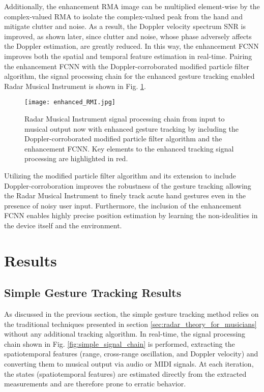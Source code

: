 \documentclass[10pt,journal,final]{IEEEtran}
\begin{document}
Additionally, the enhancement RMA image can be multiplied element-wise by the complex-valued RMA to isolate the complex-valued peak from the hand and mitigate clutter and noise. As a result, the Doppler velocity spectrum SNR is improved, as shown later, since clutter and noise, whose phase adversely affects the Doppler estimation, are greatly reduced. In this way, the enhancement FCNN improves both the spatial and temporal feature estimation in real-time. Pairing the enhancement FCNN with the Doppler-corroborated modified particle filter algorithm, the signal processing chain for the enhanced gesture tracking enabled Radar Musical Instrument is shown in Fig. \ref{fig:enhanced_signal_chain}. 

\begin{figure}[h]
	\centering
	\texttt{[image: enhanced\_RMI.jpg]}
	\caption{Radar Musical Instrument signal processing chain from input to musical output now with enhanced gesture tracking by including the Doppler-corroborated modified particle filter algorithm and the enhancement FCNN. Key elements to the enhanced tracking signal processing are highlighted in red.}
	\label{fig:enhanced_signal_chain}
\end{figure}

Utilizing the modified particle filter algorithm and its extension to include Doppler-corroboration improves the robustness of the gesture tracking allowing the Radar Musical Instrument to finely track acute hand gestures even in the presence of noisy user input. Furthermore, the inclusion of the enhancement FCNN enables highly precise position estimation by learning the non-idealities in the device itself and the environment.

\section{Results}
\label{sec:results}

\subsection{Simple Gesture Tracking Results}
\label{subsec:simple_gesture_tracking_results}
As discussed in the previous section, the simple gesture tracking method relies on the traditional techniques presented in section \ref{sec:radar_theory_for_musicians} without any additional tracking algorithm. In real-time, the signal processing chain shown in Fig. \ref{fig:simple_signal_chain} is performed, extracting the spatiotemporal features (range, cross-range oscillation, and Doppler velocity) and converting them to musical output via audio or MIDI signals. At each iteration, the states (spatiotemporal features) are estimated directly from the extracted measurements and are therefore prone to erratic behavior. 
\end{document}
